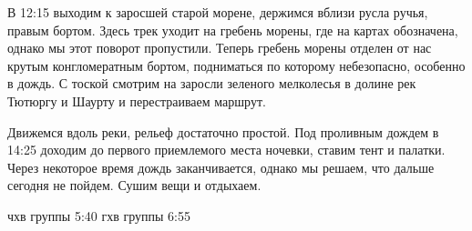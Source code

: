 В 12:15  выходим к заросшей старой морене, держимся вблизи русла ручья, правым бортом. Здесь трек уходит на гребень морены, где на картах обозначена, однако мы этот поворот пропустили. Теперь гребень морены отделен от нас крутым конгломератным бортом, подниматься по которому небезопасно, особенно в дождь. С тоской смотрим на заросли зеленого мелколесья в долине рек Тютюргу и Шаурту и перестраиваем маршрут.

Движемся вдоль реки, рельеф достаточно простой. Под проливным дождем в 14:25 доходим до первого приемлемого места ночевки, ставим тент и палатки. Через некоторое время дождь заканчивается, однако мы решаем, что дальше сегодня не пойдем. Сушим вещи и отдыхаем.









чхв группы  5:40
гхв группы  6:55



    \FloatBarrier
